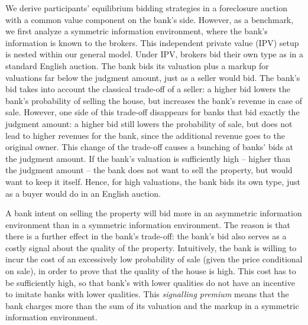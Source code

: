 \documentclass[11pt,twopage]{article}
\begin{document}

We derive participants' equilibrium bidding strategies in a
foreclosure auction with a common value component on the bank's side. 
However, as a
benchmark, we first analyze a symmetric information environment, where
the bank's information is known to the brokers. This independent
private value (IPV) setup is nested within our general model. Under
IPV, brokers bid their own type as in a standard English auction. The
bank bids its valuation plus a markup for valuations far below the
judgment amount, just as a seller would bid. The bank's bid takes into
account the classical trade-off of a seller: a higher bid lowers the
bank's probability of selling the house, but increases the bank's
revenue in case of sale. However, one side of this trade-off
disappears for banks that bid exactly the judgment amount: a higher
bid still lowers the probability of sale, but does not lead to higher
revenues for the bank, since the additional revenue goes to the
original owner. This change of the trade-off causes a bunching of
banks' bids at the judgment amount. If the bank's valuation is
sufficiently high -- higher than the judgment amount -- the bank does
not want to sell the property, but would want to keep it
itself. Hence, for high valuations, the bank bids its own type, just
as a buyer would do in an English auction.

A bank intent on selling the property will bid more in an asymmetric
information environment than in a symmetric information environment. 
The reason is that there is a further
effect in the bank's trade-off: the bank's bid also serves as a costly
signal about the quality of the property. Intuitively, the
bank is willing to incur the cost of an excessively low probability of
sale (given the price conditional on sale), in order to prove that the
quality of the house is high. This cost has to be sufficiently high,
so that bank's with lower qualities do not have an incentive to
imitate banks with lower qualities. This \emph{signalling premium} means 
that the bank charges more than the sum of its valuation and the 
markup in a symmetric information environment.
\end{document}
